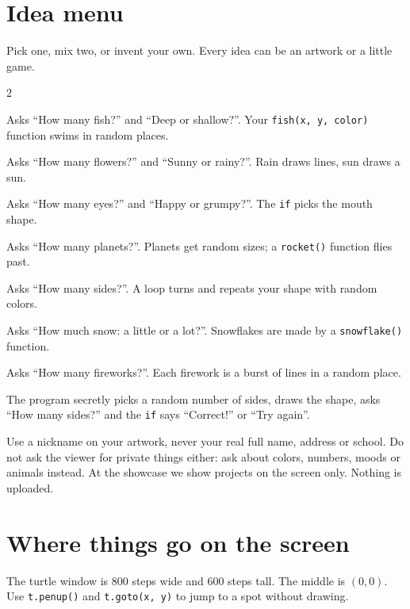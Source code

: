 \documentclass[level=1]{kidscode}
\begin{document}
\section{Idea menu}
Pick one, mix two, or invent your own. Every idea can be an artwork or a little game.

\begin{multicols}{2}
\begin{description}[leftmargin=0pt,itemsep=4pt,font=\bfseries]
  \item[Underwater world] Asks \enquote{How many fish?} and \enquote{Deep or shallow?}. Your \texttt{fish(x, y, color)} function swims in random places.
  \item[Flower garden] Asks \enquote{How many flowers?} and \enquote{Sunny or rainy?}. Rain draws lines, sun draws a sun.
  \item[Monster maker] Asks \enquote{How many eyes?} and \enquote{Happy or grumpy?}. The \texttt{if} picks the mouth shape.
  \item[Space trip] Asks \enquote{How many planets?}. Planets get random sizes; a \texttt{rocket()} function flies past.
  \item[Kaleidoscope] Asks \enquote{How many sides?}. A loop turns and repeats your shape with random colors.
  \item[Snow day] Asks \enquote{How much snow: a little or a lot?}. Snowflakes are made by a \texttt{snowflake()} function.
  \item[Fireworks show] Asks \enquote{How many fireworks?}. Each firework is a burst of lines in a random place.
  \item[Guess-the-shape game] The program secretly picks a random number of sides, draws the shape, asks \enquote{How many sides?} and the \texttt{if} says \enquote{Correct!} or \enquote{Try again}.
\end{description}
\end{multicols}

\begin{safety}
Use a nickname on your artwork, never your real full name, address or school.
Do not ask the viewer for private things either: ask about colors, numbers, moods or animals instead.
At the showcase we show projects on the screen only. Nothing is uploaded.
\end{safety}

\section{Where things go on the screen}
The turtle window is 800 steps wide and 600 steps tall. The middle is $(0, 0)$.
Use \texttt{t.penup()} and \texttt{t.goto(x, y)} to jump to a spot without drawing.
\end{document}
